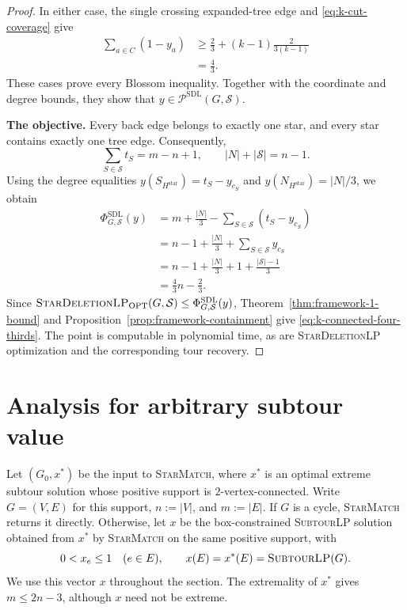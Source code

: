 \documentclass[11pt]{amsart}
\newcommand{\1}{\mathbbm{1}}
\newcommand{\ALG}{\textsc{StarMatch}}
\newcommand{\SubtourLP}{\textsc{SubtourLP}}
\newcommand{\LPone}{\textsc{StarDeletionLP}}
\newcommand{\Pone}{\mathcal P^{\mathrm{SDL}}}
\newcommand{\PhiOne}{\Phi^{\mathrm{SDL}}}
\begin{document}
\begin{proof}
In either case, the single crossing expanded-tree edge and
\eqref{eq:k-cut-coverage} give
\[
 \begin{aligned}
 \sum_{a\in C}(1-y_a)
 &\ge\frac23+(k-1)\frac{2}{3(k-1)}\\
 &=\frac43.
 \end{aligned}
\]
These cases prove every Blossom inequality. Together with the
coordinate and degree bounds, they show that
$y\in\Pone(G,\mathcal S)$.

\smallskip\noindent
\textbf{The objective.}
Every back edge belongs to exactly one star, and every star
contains exactly one tree edge. Consequently,
\[
 \sum_{S\in\mathcal S}t_S=m-n+1,
 \qquad |N|+|\mathcal S|=n-1.
\]
Using the degree equalities $y(S_{H^{\mathrm{star}}})=t_S-y_{c_S}$ and
$y(N_{H^{\mathrm{star}}})=|N|/3$, we obtain
\[
 \begin{aligned}
 \PhiOne_{G,\mathcal S}(y)
 &=m+\frac{|N|}{3}
      -\sum_{S\in\mathcal S}(t_S-y_{c_S})\\
 &=n-1+\frac{|N|}{3}+\sum_{S\in\mathcal S}y_{c_S}\\
 &=n-1+\frac{|N|}{3}+1+\frac{|\mathcal S|-1}{3}\\
 &=\frac43n-\frac23.
 \end{aligned}
\]
Since $\text{\LPone}_{\mathrm{OPT}}(G,\mathcal S)\le\PhiOne_{G,\mathcal S}(y)$,
Theorem~\ref{thm:framework-1-bound} and
Proposition~\ref{prop:framework-containment} give
\eqref{eq:k-connected-four-thirds}. The point is computable
in polynomial time, as are \LPone{} optimization and
the corresponding tour recovery.
\end{proof}


\clearpage
\raggedbottom





















\section{\texorpdfstring{{Analysis for arbitrary subtour value}}{Analysis for arbitrary subtour value}}
\label{s12pair:general}
\label{sec:general-L}
\label{s10g:main-subsection}

Let $(G_0,x^*)$ be the input to \ALG{}, where $x^*$ is an
optimal extreme subtour solution whose positive support is
$2$-vertex-connected. Write $G=(V,E)$ for this support,
{$n:=|V|$, and $m:=|E|$.}
If $G$ is a cycle, \ALG{} returns it directly. Otherwise,
let $x$ be the box-constrained \SubtourLP{} solution obtained
from $x^*$ by \ALG{} on the same positive support, with
\[
 0<x_e\le1\quad(e\in E),
 \qquad x(E)=x^*(E)={\text{\SubtourLP}(G)}.
\]
We use this vector $x$ throughout the section. The extremality
of $x^*$ gives $m\le2n-3$, although $x$ need not be extreme.
\end{document}
